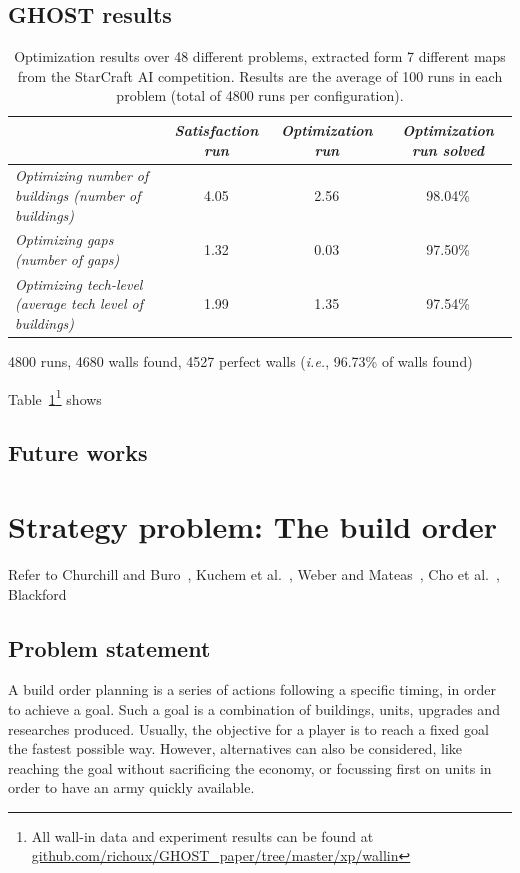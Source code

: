 \documentclass[journal]{IEEEtran}
\newcommand{\ghost}{\textsc{GHOST}\xspace}
\newcommand{\ie}{\textit{i.e.}}
\begin{document}
\subsection{\ghost results}
\begin{table}[ht]
    \caption{Optimization   results   over  48   different   problems,
      extracted  form   7  different   maps  from  the   StarCraft  AI
      competition. Results are the average of 100 runs in each problem
      (total of 4800 runs per configuration).}
    \label{tab:wall}
    \centering
    \begin{tabular}{|l|c|c|c|}
      \cline{2-4}
      \multicolumn{1}{c|}{} & {\em Satisfaction run}& {\em Optimization run}& {\em Optimization run solved} \\
      \hline
      {\em Optimizing number of buildings (number of buildings)} 	& 4.05                  & 2.56                  & 98.04\% \\ 
      {\em Optimizing gaps (number of gaps)} 				& 1.32                  & 0.03                  & 97.50\%  \\ 
      {\em Optimizing tech-level (average tech level of buildings)} 	& 1.99                  & 1.35                 & 97.54\%  \\
      \hline
    \end{tabular}  
\end{table}
4800 runs, 4680 walls found, 4527 perfect walls (\ie, 96.73\% of walls
found)

Table~\ref{tab:wall}\footnote{All wall-in data  and experiment results
  can                   be                  found                   at
  \href{https://github.com/richoux/GHOST\_paper/tree/master/xp/wallin}{github.com/richoux/GHOST\_paper/tree/master/xp/wallin}}
shows

\subsection{Future works}


\section{Strategy problem: The build order}\label{sec:bo}

Refer   to   Churchill   and   Buro~\cite{ChurchillB11},   Kuchem   et
al.~\cite{KuchemPR13},  Weber   and  Mateas~\cite{WeberM09},   Cho  et
al.~\cite{ChoKC13}, Blackford~\cite{Blackford14}

\subsection{Problem statement}
A build  order planning is  a series  of actions following  a specific
timing, in order  to achieve a goal.  Such a goal is  a combination of
buildings,  units,  upgrades  and researches  produced.  Usually,  the
objective for a  player is to reach a fixed  goal the fastest possible
way. However, alternatives  can also be considered,  like reaching the
goal without sacrificing  the economy, or focussing first  on units in
order to have an army quickly available.
\end{document}
